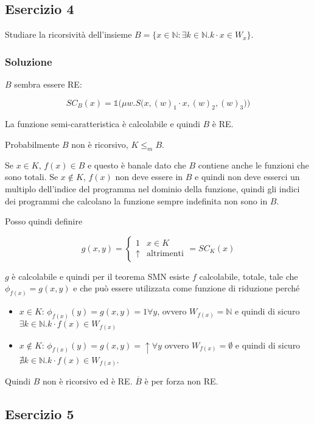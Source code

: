 \subsection{Esercizio 4}

Studiare la ricorsività dell'insieme $B = \{ x \in \mathbb{N} : \exists k \in \mathbb{N} . k \cdot x \in W_x \}$.

\subsubsection{Soluzione}

$B$ sembra essere RE:

$$
SC_B(x) =\mathbb{1}\bigg( \mu w . S\Big(x, (w)_1 \cdot x, (w)_2, (w)_3 \Big) \bigg)
$$

La funzione semi-caratteristica è calcolabile e quindi $B$ è RE.

Probabilmente $B$ non è ricorsivo, $K \leq_m B$.

Se $x \in K$, $f(x) \in B$ e questo è banale dato che $B$ contiene anche le funzioni che sono totali. Se $x \notin K$, $f(x)$ non deve essere in $B$ e quindi non deve esserci un multiplo dell'indice del programma nel dominio della funzione, quindi gli indici dei programmi che calcolano la funzione sempre indefinita non sono in $B$.

Posso quindi definire

$$
g(x,y) = \begin{cases}
1& x \in K \\
\uparrow & \text{altrimenti}
\end{cases} = SC_K(x) 
$$

$g$ è calcolabile e quindi per il teorema SMN esiste $f$ calcolabile, totale, tale che $\phi_{f(x) } = g(x,y)$ e che può essere utilizzata come funzione di riduzione perché

\begin{itemize}
	\item $x \in K$: $\phi_{f(x)}(y) = g(x,y) = 1 \forall y$, ovvero $W_{f(x)} = \mathbb{N}$ e quindi di sicuro $\exists k \in \mathbb{N}. k\cdot f(x) \in W_{f(x)}$
	\item $x \notin K$: $\phi_{f(x)}(y) = g(x,y) = \uparrow \forall y$ ovvero $W_{f(x)} = \emptyset$ e quindi di sicuro $\nexists k \in \mathbb{N}. k\cdot f(x) \in W_{f(x)}$.
\end{itemize}

Quindi $B$ non è ricorsivo ed è RE. $\overline{B}$ è per forza non RE.

\subsection{Esercizio 5}

